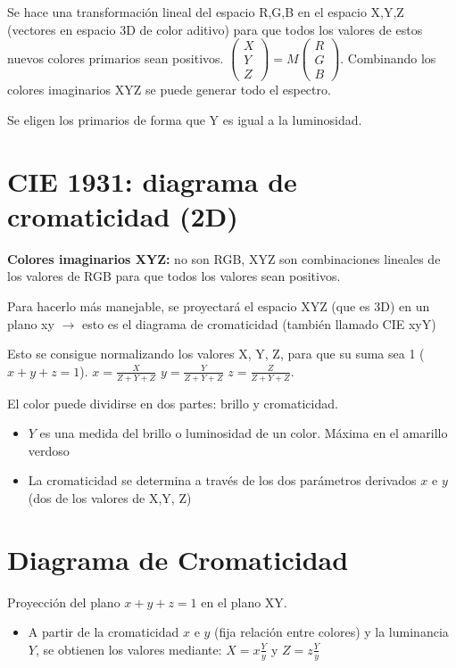 Se hace una transformación lineal del espacio R,G,B en el espacio X,Y,Z (vectores en espacio 3D de color aditivo) para que todos los valores de estos nuevos colores primarios sean positivos. $\left(\begin{matrix} X \\ Y \\ Z \end{matrix}\right)=M\left(\begin{matrix} R \\ G \\ B \end{matrix}\right)$. Combinando los colores imaginarios XYZ se puede generar todo el espectro.

Se eligen los primarios de forma que Y es igual a la luminosidad.

\section{CIE 1931: diagrama de cromaticidad (2D)}
\textbf{Colores imaginarios XYZ:} no son RGB, XYZ son combinaciones lineales de los valores de RGB para que todos los valores sean positivos.

Para hacerlo más manejable, se proyectará el espacio XYZ (que es 3D) en un plano xy $\rightarrow$ esto es el diagrama de cromaticidad (también llamado CIE xyY)

Esto se consigue normalizando los valores X, Y, Z, para que su suma sea 1 ($x+y+z=1$). $x=\frac{X}{Z+Y+Z}$ $y=\frac{Y}{Z+Y+Z}$ $z=\frac{Z}{Z+Y+Z}$.

El color puede dividirse en dos partes: brillo y cromaticidad.
\begin{itemize}
    \item $Y$ es una medida del brillo o luminosidad de un color. Máxima en el amarillo verdoso
    \item La cromaticidad se determina a través de los dos parámetros derivados $x$ e $y$ (dos
    de los valores de X,Y, Z)
\end{itemize}

\section{Diagrama de Cromaticidad}
Proyección del plano $x+y+z=1$ en el plano XY.
\begin{itemize}
    \item A partir de la cromaticidad $x$ e $y$ (fija relación entre colores) y la luminancia $Y$, se obtienen los valores mediante: $X=x\frac{Y}{y}$ y $Z=z\frac{Y}{y}$
\end{itemize}

